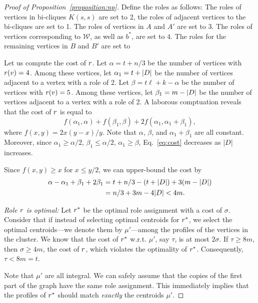 \begin{proof}[Proof of Proposition~\ref{proposition:np}]
Define the roles as follows: The roles of vertices in bi-cliques $K(s, s)$ are
set to 2, the roles of adjacent vertices to the bi-cliques are set to 1. The
roles of vertices in $A$ and $A'$ are set to 3. The roles of vertices
corresponding to $\mathcal{W}$, as well as $b^*$, are set to $4$.
The roles for the remaining vertices in $B$ and $B'$ are set to 

Let us compute the cost of $r$.
Let $\alpha = t + n / 3$ be the number of vertices with $r(v) = 4$.
Among these vertices,
let $\alpha_1 = t + {\left|D\right|}$ be the number of vertices adjacent to a vertex with
a role of 2.
Let $\beta = t\ell + k - \alpha$ be the number of vertices with $r(v) = 5$.
Among these vertices,
let $\beta_1 = m - {\left|D\right|}$ be the number of vertices adjacent to a vertex with
a role of 2.
A laborous comptuation reveals that the cost of $r$ is equal to
\begin{equation}
\label{eq:cost}
	f(\alpha_1, \alpha) + f(\beta_1, \beta) + 2f(\alpha_1, \alpha_1 + \beta_1),
\end{equation}
where $f(x, y) = 2x(y - x)/y$. Note that $\alpha$, $\beta$, and $\alpha_1 + \beta_1$ are all constant.
Moreover, since
$\alpha_1 \geq \alpha / 2$,
$\beta_1 \leq \alpha / 2$,
$\alpha_1 \geq \beta$, Eq.~\ref{eq:cost} decreases as ${\left|D\right|}$ increases.


Since $f(x, y) \geq x$ for $x \leq y / 2$,
we can upper-bound the cost by
\[
\begin{split}
	\alpha - \alpha_1 + \beta_1 + 2\beta_1 & = t + n / 3 - (t + {\left|D\right|}) + 3(m - {\left|D\right|}) \\
	& = n / 3 + 3m - 4{\left|D\right|} < 4m.
\end{split}
\]

\fi

\emph{Role $r$ is optimal:}
Let $r^*$ be the optimal role assignment with a cost of $\sigma$.  Consider
that if instead of selecting optimal centroids for $r^*$, we select the
optimal centroids---we denote them by $\mu'$---among the profiles of the
vertices in the cluster. We know that the cost of $r^*$ w.r.t. $\mu'$, say
$\tau$, is at most $2\sigma$. If $\tau \geq 8m$, then $\sigma \geq 4m$, the cost of $r$, which
violates the optimality of $r^*$. Consequently, $\tau < 8m = t$.

Note that $\mu'$ are all integral. We can safely assume that the copies of the
first part of the graph have the same role assignment. This immediately implies
that the profiles of $r^*$ should match \emph{exactly} the centroids $\mu'$.


\end{proof}
